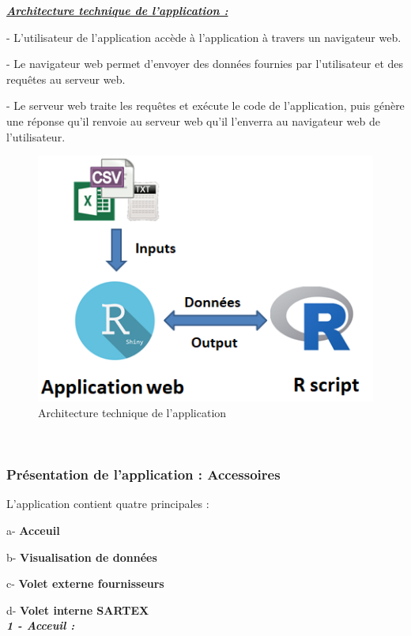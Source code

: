 \documentclass[12pt, a4paper]{thesis}
\begin{document}
\underline{\textit{\textbf{Architecture technique de l'application :}}}
\item - L'utilisateur de l'application accède à l'application à travers un navigateur
web.
\item - Le navigateur web permet d'envoyer des données fournies par l'utilisateur et
des requêtes au serveur web.
\item - Le serveur web traite les requêtes et exécute le code de l'application, puis génère une réponse qu'il renvoie au serveur web qu'il l'enverra au navigateur web de l'utilisateur.
\begin{figure}[!h]
\begin{center} 
\includegraphics[scale=0.75]{archi.PNG} 
\caption{Architecture technique de l'application}
\end{center}
\end{figure}\\

\subsubsection{Présentation de l'application : Accessoires}
L'application contient quatre principales :
\item a- \textbf{Acceuil}
\item b- \textbf{Visualisation de données}
\item c- \textbf{Volet externe fournisseurs}
\item d- \textbf{Volet interne SARTEX}\\
 
 
 
 
 
 \textit{\textbf{1 - Acceuil :}} \\
\end{document}
